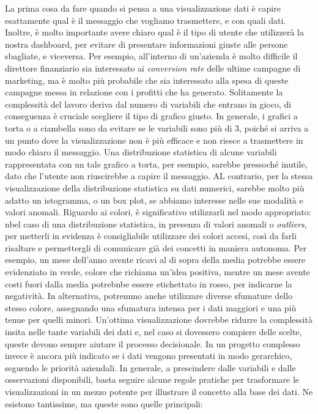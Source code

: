 La prima cosa da fare quando si pensa a una visualizzazione dati è capire esattamente qual è il messaggio che vogliamo trasmettere, e con quali dati. Inoltre, è molto importante avere chiaro qual è il tipo di utente che utilizzerà la nostra dashboard, per evitare di presentare informazioni giuste alle persone sbagliate, e viceversa. Per esempio, all'interno di un'azienda è molto difficile il direttore finanziario sia interessato ai \textit{conversion rate} delle ultime campagne di marketing, ma è molto più probabile che sia interessato alla spesa di queste campagne messa in relazione con i profitti che ha generato.
Solitamente la complessità del lavoro deriva dal numero di variabili che entrano in gioco, di conseguenza è cruciale scegliere il tipo di grafico giusto.
In generale, i grafici a torta o a ciambella sono da evitare se le variabili sono più di 3, poiché si arriva a un punto dove la visualizzazione non è più efficace e non riesce a trasmettere in modo chiaro il messaggio. Una distribuzione statistica di alcune variabili rappresentata con un tale grafico a torta, per esempio, sarebbe pressoché inutile, dato che l'utente non riuscirebbe a capire il messaggio. AL contrario, per la stessa visualizzazione della distribuzione statistica su dati numerici, sarebbe molto più adatto un istogramma, o un box plot, se abbiamo interesse nelle sue modalità e valori anomali.
Riguardo ai colori, è significativo utilizzarli nel modo appropriato: nbel caso di una distribuzione statistica, in presenza di valori anomali o \textit{outliers}, per metterli in evidenza è consigliabile utilizzare dei colori accesi, così da farli risaltare e permettergli di comunicare già dei concetti in maniera autonoma. Per esempio, un mese dell'anno avente ricavi al di sopra della media potrebbe essere evidenziato in verde, colore che richiama un'idea positiva, mentre un mese avente costi fuori dalla media potrebnbe essere etichettato in rosso, per indicarne la negatività. In alternativa, potremmo anche utilizzare diverse sfumature dello stesso colore, assegnando una sfumatura intensa per i dati maggiori e una più tenue per quelli minori.
Un'ottima visualizzazione dovrebbe ridurre la complessità insita nelle tante variabili dei dati e, nel caso si dovessero compiere delle scelte, queste devono sempre aiutare il processo decisionale. In un progetto complesso invece è ancora più indicato se i dati vengono presentati in modo gerarchico, seguendo le priorità aziendali.
In generale, a prescindere dalle variabili e dalle osservazioni disponibili, basta seguire alcune regole pratiche per trasformare le visualizzazioni in un mezzo potente per illustrare il concetto alla base dei dati. Ne esistono tantissime, ma queste sono quelle principali:
